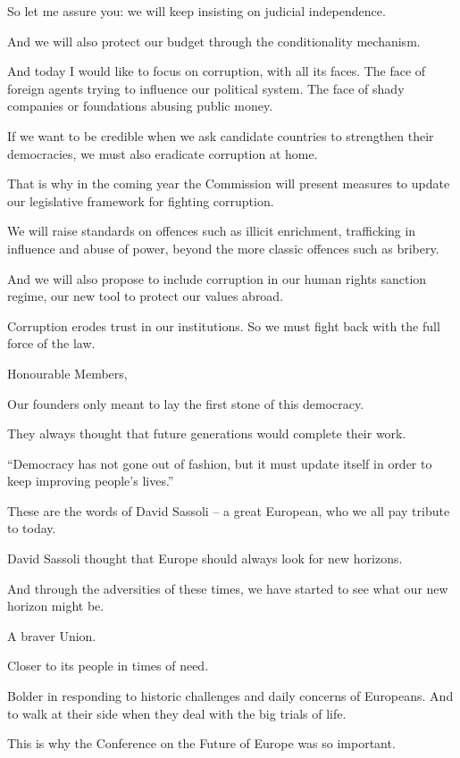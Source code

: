 \documentclass[a4paper,11pt]{article}
\begin{document}
So let me assure you: we will keep insisting on judicial independence.

And we will also protect our budget through the conditionality mechanism.

And today I would like to focus on corruption, with all its faces. The face of foreign agents trying to influence our political system. The face of shady companies or foundations abusing public money.

If we want to be credible when we ask candidate countries to strengthen their democracies, we must also eradicate corruption at home.

That is why in the coming year the Commission will present measures to update our legislative framework for fighting corruption.

We will raise standards on offences such as illicit enrichment, trafficking in influence and abuse of power, beyond the more classic offences such as bribery. 

And we will also propose to include corruption in our human rights sanction regime, our new tool to protect our values abroad.

Corruption erodes trust in our institutions. So we must fight back with the full force of the law.

 

Honourable Members,

Our founders only meant to lay the first stone of this democracy.

They always thought that future generations would complete their work.

“Democracy has not gone out of fashion, but it must update itself in order to keep improving people's lives.”

These are the words of David Sassoli – a great European, who we all pay tribute to today.

David Sassoli thought that Europe should always look for new horizons.

And through the adversities of these times, we have started to see what our new horizon might be.

A braver Union.

Closer to its people in times of need.

Bolder in responding to historic challenges and daily concerns of Europeans. And to walk at their side when they deal with the big trials of life.

This is why the Conference on the Future of Europe was so important.
\end{document}
